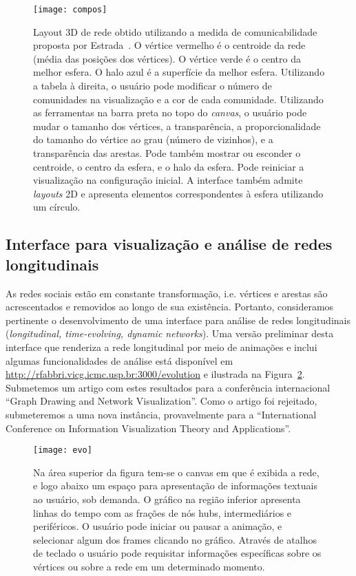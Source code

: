 \documentclass[a4paper, 11pt]{article}
\begin{document}
\begin{figure}[h!]
\centering
  \texttt{[image: compos]}
\caption{%
  Layout 3D de rede obtido utilizando a medida de comunicabilidade proposta por Estrada~\cite{ern2,ern3}.
  O vértice vermelho é o centroide da rede (média das posições
  dos vértices).
  O vértice verde é o centro da melhor esfera.
  O halo azul é a superfície da melhor esfera.
  Utilizando a tabela à direita, o usuário pode
  modificar o número de comunidades na visualização
  e a cor de cada comunidade.
  Utilizando as ferramentas na barra preta no topo do \emph{canvas},
  o usuário pode mudar o tamanho dos vértices, a transparência,
  a proporcionalidade do tamanho do vértice ao grau (número de vizinhos),
  e a transparência das arestas.
  Pode também mostrar ou esconder o centroide, o centro da esfera,
  e o halo da esfera.
  Pode reiniciar a visualização na configuração inicial. %
  A interface também admite \emph{layouts} 2D e
  apresenta elementos correspondentes à esfera utilizando um círculo.
}\label{com}
\end{figure}


\subsection{Interface para visualização e análise de redes longitudinais}\label{sevo}
As redes sociais estão em constante transformação, i.e. vértices e arestas são
acrescentados e removidos ao longo de sua existência.
Portanto, consideramos pertinente o desenvolvimento de uma interface
para análise de redes longitudinais (\emph{longitudinal, time-evolving, dynamic networks}).
Uma versão preliminar desta interface que renderiza a rede longitudinal por meio de animações e inclui algumas funcionalidades de análise está disponível em \url{http://rfabbri.vicg.icmc.usp.br:3000/evolution} e ilustrada na Figura~\ref{evo}.
Submetemos um artigo com estes resultados para a conferência internacional ``Graph Drawing and Network Visualization''.
    Como o artigo foi rejeitado, submeteremos a uma nova instância, provavelmente para a ``International Conference on Information Visualization Theory and Applications''.

\begin{figure}[h!]
\centering
  \texttt{[image: evo]}
\caption{%
  Na área superior da figura tem-se o canvas em que é exibida a rede, e logo abaixo um espaço para apresentação de informações textuais ao usuário, sob demanda. O gráfico na região inferior apresenta linhas do tempo com as frações de nós hubs, intermediários e periféricos.
  O usuário pode iniciar ou pausar a animação, e selecionar algum dos frames clicando no gráfico.
  Através de atalhos de teclado o usuário pode requisitar informações específicas sobre os vértices ou sobre a rede em um determinado momento.
}\label{evo}
\end{figure}
\end{document}
